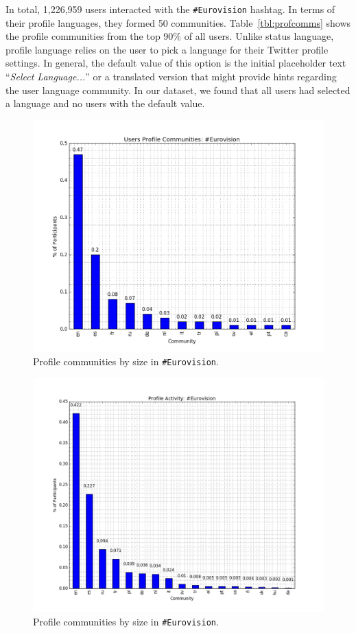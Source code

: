 In total, 1,226,959 users interacted with the {\texttt{\#Eurovision}}
hashtag. In terms of their profile languages, they formed 50
communities. Table~\ref{tbl:profcomms} shows the profile communities
from the top 90\% of all users. Unlike status language, profile
language relies on the user to pick a language for their Twitter
profile settings. In general, the default value of this option is the
initial placeholder text ``{\emph{Select Language...}}'' or a
translated version that might provide hints regarding the user
language community. In our dataset, we found that all users had
selected a language and no users with the default value.

\begin{figure}[htb]
\centering
\includegraphics[width=\columnwidth]{images/eurovision_profile_size.png}
\caption{Profile communities by size in {\texttt{\#Eurovision}}.}
\label{fig:eurovisionprofilesize}
\end{figure}

\begin{figure}[htb]
\centering
\includegraphics[width=\columnwidth]{images/eurovision_profile_activity.png}
\caption{Profile communities by size in {\texttt{\#Eurovision}}.}
\label{fig:eurovisionprofileactivity}
\end{figure}

